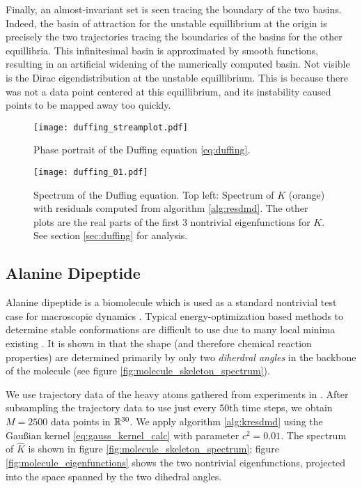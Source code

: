 Finally, an almost-invariant set is seen tracing 
the boundary of the two basins. Indeed, the basin of attraction for the unstable 
equillibrium  at the origin is precisely the two trajectories tracing the boundaries of the 
basins for the other equillibria. This infinitesimal basin is approximated by smooth 
functions, resulting in an artificial widening of the numerically computed basin. Not visible 
is the Dirac eigendistribution at the unstable equillibrium. This is because there was not 
a data point centered at this equillibrium, and its instability caused points to be mapped 
away too quickly. 


\begin{figure}
    \centering
    \texttt{[image: duffing\_streamplot.pdf]}
    \caption{
        Phase portrait of the Duffing equation \ref{eq:duffing}. 
    }\label{fig:duffing_streamplot}
\end{figure}

\begin{figure}
    \centering
    \texttt{[image: duffing\_01.pdf]}
    \caption{
        Spectrum of the Duffing equation. Top left: Spectrum of $K$ (orange) with 
        residuals computed from algorithm \ref{alg:resdmd}. The other plots are the 
        real parts of the first $3$ nontrivial eigenfunctions for $K$. See section 
        \ref{sec:duffing} for analysis. 
    }\label{fig:duffing}
\end{figure}

\subsection{Alanine Dipeptide}\label{sec:molecule}

Alanine dipeptide is a biomolecule which is used as a standard nontrivial test case 
for macroscopic dynamics \cite{entropic}. Typical energy-optimization based methods 
to determine stable conformations are difficult to use due to many local minima 
existing \cite{molecule}. It is shown in \cite{molecule} that the shape (and therefore 
chemical reaction properties) are determined primarily by only two \emph{diherdral angles} 
in the backbone of the molecule (see figure \ref{fig:molecule_skeleton_spectrum}). 

We use trajectory data of the heavy atoms gathered from experiments in 
\cite{molecule_experiment}. After subsampling the trajectory data to use just every $50$th 
time steps, we obtain $M = 2500$ data points in $\mathbb{R}^{30}$. We apply algorithm 
\ref{alg:kresdmd} using the Gaußian kernel \ref{eq:gauss_kernel_calc} with parameter 
$c^2 = 0.01$. The spectrum of $\widehat{ K }$ is shown in figure 
\ref{fig:molecule_skeleton_spectrum}; figure \ref{fig:molecule_eigenfunctions} shows the 
two nontrivial eigenfunctions, projected into the space spanned by the two dihedral angles. 

